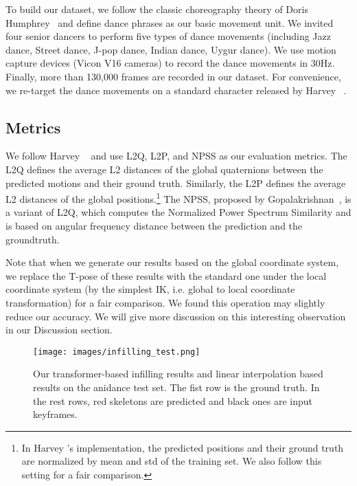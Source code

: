 \documentclass[10pt,twocolumn,letterpaper]{article}
\begin{document}
To build our dataset, we follow the classic choreography theory of Doris Humphrey~\cite{humphrey1959art} and define dance phrases as our basic movement unit. We invited four senior dancers to perform five types of dance movements (including Jazz dance, Street dance, J-pop dance, Indian dance, Uygur dance). We use motion capture devices (Vicon V16 cameras) to record the dance movements in 30Hz. Finally, more than 130,000 frames are recorded in our dataset. For convenience, we re-target the dance movements on a standard character released by Harvey \etal~\cite{harvey2020robust}.


\subsection{Metrics}

We follow Harvey \etal~\cite{harvey2020robust} and use L2Q, L2P, and NPSS as our evaluation metrics. The L2Q defines the average L2 distances of the global quaternions between the predicted motions and their ground truth. Similarly, the L2P defines the average L2 distances of the global positions.\footnote{In Harvey \etal's implementation, the predicted positions and their ground truth are normalized by mean and std of the training set. We also follow this setting for a fair comparison.} The NPSS, proposed by Gopalakrishnan~\cite{gopalakrishnan2019neural}, is a variant of L2Q, which computes the Normalized Power Spectrum Similarity and is based on angular frequency distance between the prediction and the groundtruth. 

Note that when we generate our results based on the global coordinate system, we replace the T-pose of these results with the standard one under the local coordinate system (by the simplest IK, i.e. global to local coordinate transformation) for a fair comparison. We found this operation may slightly reduce our accuracy. We will give more discussion on this interesting observation in our Discussion section.



\begin{figure*}[ht]
  \centering
  \texttt{[image: images/infilling\_test.png]}
  \caption{Our transformer-based infilling results and linear interpolation based results on the anidance test set. The fist row is the ground truth. In the rest rows, red skeletons are predicted and black ones are input keyframes.}
  \label{fig:infilling_test}
\end{figure*}
\end{document}
